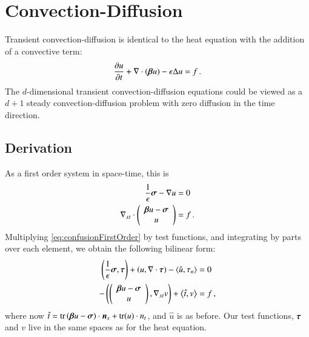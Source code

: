 \documentclass[preprint,12pt]{elsarticle}
\begin{document}
%                                                                                      
%                                                                                      
%        
\section{Convection-Diffusion}
Transient convection-diffusion is identical to the heat equation with the addition of a convective term:
\begin{equation*}
\frac{\partial u}{\partial t}+\nabla\cdot(\boldsymbol\beta u)-\epsilon\Delta u=f\,.
\end{equation*}
The $d$-dimensional transient convection-diffusion equations could be viewed as a $d+1$ steady convection-diffusion problem with zero diffusion in the time direction.

\subsection{Derivation}
As a first order system in space-time, this is
\begin{equation}
\label{eq:confusionFirstOrder}
\begin{aligned}
\frac{1}{\epsilon}\boldsymbol\sigma-\nabla u&=0\\
\nabla_{xt}\cdot\left( \begin{array}{c} \boldsymbol\beta u-\boldsymbol\sigma\\ u\\ \end{array} \right)&=f\,.
\end{aligned}
\end{equation}
Multiplying \eqref{eq:confusionFirstOrder} by test functions, and integrating by parts over each element, we obtain the following bilinear form:
\begin{equation}
\label{eq:confusionBF}
	\begin{aligned}
		\left( \frac{1}{\epsilon}\boldsymbol\sigma,\boldsymbol\tau \right)+\left( u,\nabla\cdot\boldsymbol\tau \right)-\left\langle \hat u,\tau_n \right\rangle&=0\\
		-\left( \left( \begin{array}{c} \boldsymbol\beta u-\boldsymbol\sigma\\ u\\ \end{array} \right),\nabla_{xt} v \right)+\left\langle \hat t,v \right\rangle&=f\,,
	\end{aligned}
\end{equation}
where now $\hat t=\operatorname*{tr}\left( \boldsymbol\beta u-\boldsymbol\sigma \right)\cdot\boldsymbol n_x+\operatorname*{tr}(u)\cdot n_t$, and $\hat u$ is as before. Our test functions, $\boldsymbol\tau$ and $v$ live in the same spaces as for the heat equation.
\end{document}
